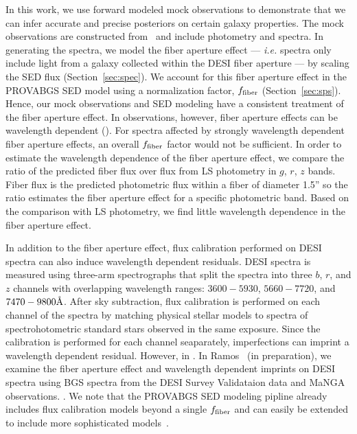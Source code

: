 In this work, we use forward modeled mock observations to demonstrate that we
can infer accurate and precise posteriors on certain galaxy properties.
The mock observations are constructed from \lgal~and include photometry and
spectra. 
In generating the spectra, we model the fiber aperture effect --- \emph{i.e.}
spectra only include light from a galaxy collected within the DESI fiber
aperture --- by scaling the SED flux (Section~\ref{sec:spec}).
We account for this fiber aperture effect in the {\sc PROVABGS} SED model using 
a normalization factor, $f_{\rm fiber}$ (Section~\ref{sec:sps}). 
Hence, our mock observations and SED modeling have a consistent treatment of
the fiber aperture effect. 
In observations, however, fiber aperture effects can be wavelength dependent
(). 
For spectra affected by strongly wavelength dependent fiber aperture effects,
an overall $f_{\rm fiber}$ factor would not be sufficient.
In order to estimate the wavelength dependence of the fiber aperture
effect, we compare the ratio of the predicted fiber flux over flux from LS
photometry in  $g$, $r$, $z$ bands. 
Fiber flux is the predicted photometric flux within a fiber of diameter 1.5''
so the ratio estimates the fiber aperture effect for a specific photometric band. 
Based on the comparison with LS photometry, we find little wavelength
dependence in the fiber aperture effect. 

In addition to the fiber aperture effect, flux calibration performed on DESI
spectra can also induce wavelength dependent residuals. 
DESI spectra is measured using three-arm spectrographs that split the spectra
into three $b$, $r$, and $z$ channels with overlapping wavelength ranges: 
$3600 - 5930$, $5660 - 7720$, and $7470 - 9800 \AA$.  
After sky subtraction, flux calibration is performed on each channel of the
spectra by matching physical stellar models to spectra of spectrohotometric
standard stars observed in the same exposure. 
Since the calibration is performed for each channel seaparately, imperfections
can imprint a wavelength dependent residual. 
However, in .
In Ramos \etal~(in preparation), we examine the fiber aperture effect and
wavelength dependent imprints on DESI spectra using BGS spectra from the DESI
Survey Validataion data and MaNGA observations. 
. 
We note that the {\sc PROVABGS} SED modeling pipline already includes flux
calibration models beyond a single $f_{\rm fiber}$ and can easily be extended
to include more sophisticated models~\citep[\emph{e.g.} Chebyschev
polynomial][]{carnall2017, tacchella2021}. 

